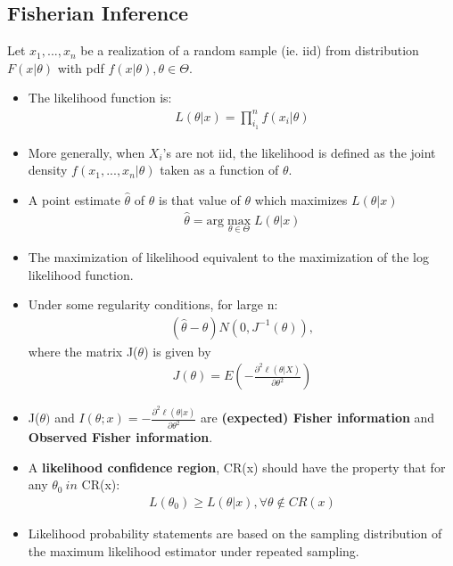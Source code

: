 \documentclass[12pt, oneside]{article}
\begin{document}
\begin{itemize}
 
 \subsection{Fisherian Inference}
 Let $x_1,...,x_n$ be a realization of a random sample (ie. iid) from distribution $F(x|\theta)$ with pdf $f(x|\theta), \theta \in \Theta.$ \\
 
 \begin{itemize}
     \item The likelihood function is:
         \begin{align*}
            L(\theta|x) = \prod_{i_1}^n f(x_i|\theta)
         \end{align*}
    \item  More generally, when $X_i$'s are not iid, the likelihood is defined as the joint density $f(x_1,...,x_n|\theta)$ taken as a function of $\theta$.
    \item A point estimate $\hat{\theta}$ of $\theta$ is that value of $\theta$ which maximizes $L(\theta|x)$
        \begin{align*}
            \hat{\theta} = \text{arg} \max_{\theta \in \Theta} L(\theta|x)
        \end{align*}
    \item The maximization of likelihood equivalent to the maximization of the log likelihood function.
    \item Under some regularity conditions, for large n:
    \begin{align*}
        (\hat{\theta} - \theta) N(0, J^{-1}(\theta)),
    \end{align*}
    where the matrix J($\theta$) is given by 
    \begin{align*}
        J(\theta) = E \left(- \frac{\partial^2 \ell (\theta|X)}{\partial \theta^2} \right)
    \end{align*}
    \item J($\theta)$ and $I(\theta;x) = -\frac{\partial^2 \ell (\theta|x)}{\partial \theta^2}$ are \textbf{(expected) Fisher information} and \textbf{Observed Fisher information}.
    \item A \textbf{likelihood confidence region}, CR(x) should have the property that for any $\theta_0 \ in$ CR(x): 
    \begin{align*}
        L(\theta_0) \geq L(\theta|x), \forall \theta \notin CR(x)
    \end{align*}
    \item Likelihood probability statements are based on the sampling distribution of the maximum likelihood estimator under repeated sampling.
 \end{itemize}
 

\end{itemize}
\end{document}

